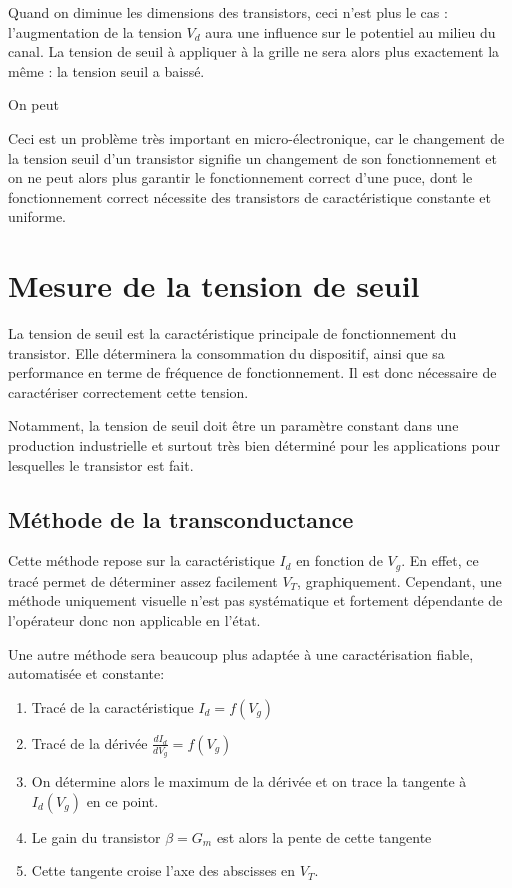 \documentclass[a4paper,11pt]{report}
\begin{document}
Quand on diminue les dimensions des transistors, ceci n'est plus le cas : l'augmentation de la tension $V_d$ aura une influence sur le potentiel au milieu du canal. La tension de seuil à appliquer à la grille ne sera alors plus exactement la même : la tension seuil a baissé.

On peut

Ceci est un problème très important en micro-électronique, car le changement de la tension seuil d'un transistor signifie un changement de son fonctionnement et on ne peut alors plus garantir le fonctionnement correct d'une puce, dont le fonctionnement correct nécessite des transistors de caractéristique constante et uniforme.

\chapter{Mesure de la tension de seuil}
La tension de seuil est la caractéristique principale de fonctionnement du transistor. Elle déterminera la consommation du dispositif, ainsi que sa performance en terme de fréquence de fonctionnement. Il est donc nécessaire de caractériser correctement cette tension.

Notamment, la tension de seuil doit être un paramètre constant dans une production industrielle et surtout très bien déterminé pour les applications pour lesquelles le transistor est fait.

\section{Méthode de la transconductance}
Cette méthode repose sur la caractéristique $I_d$ en fonction de $V_g$. En effet, ce tracé permet de déterminer assez facilement $V_T$, graphiquement. Cependant, une méthode uniquement visuelle n'est pas systématique et fortement dépendante de l'opérateur donc non applicable en l'état.

Une autre méthode sera beaucoup plus adaptée à une caractérisation fiable, automatisée et constante:
\begin{enumerate}
    \item Tracé de la caractéristique $I_d = f(V_g)$
    \item Tracé de la dérivée $\frac{d I_d}{d V_g} = f(V_g)$
    \item On détermine alors le maximum de la dérivée et on trace la tangente à $I_d(V_g)$ en ce point.
    \item Le gain du transistor $\beta = G_m$ est alors la pente de cette tangente
    \item Cette tangente croise l'axe des abscisses en $V_T$.
\end{enumerate}
\end{document}
